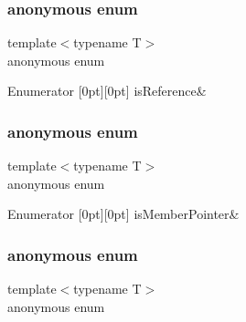 \subsubsection{\texorpdfstring{anonymous enum}{anonymous enum}}
{\footnotesize\ttfamily template$<$typename T$>$ \\
anonymous enum}

\begin{DoxyEnumFields}{Enumerator}
[0pt][0pt]{}\mbox{\label{classUtil_1_1TypeTraits_ad8ec6b7fcee82a1169b89d2da8419edaac0cdaf0e77f765430820e96bb7cf4619}} 
is\+Reference&\\
\hline

\end{DoxyEnumFields}
\mbox{\label{classUtil_1_1TypeTraits_ad2b47cd121495f38449b1f8c10afb067}} 
\subsubsection{\texorpdfstring{anonymous enum}{anonymous enum}}
{\footnotesize\ttfamily template$<$typename T$>$ \\
anonymous enum}

\begin{DoxyEnumFields}{Enumerator}
[0pt][0pt]{}\mbox{\label{classUtil_1_1TypeTraits_ad2b47cd121495f38449b1f8c10afb067abe04caa758890fee25930d96123265d2}} 
is\+Member\+Pointer&\\
\hline

\end{DoxyEnumFields}
\mbox{\label{classUtil_1_1TypeTraits_a0f0377d04bff7d1a5d06e076ea5b1e2f}} 
\subsubsection{\texorpdfstring{anonymous enum}{anonymous enum}}
{\footnotesize\ttfamily template$<$typename T$>$ \\
anonymous enum}

